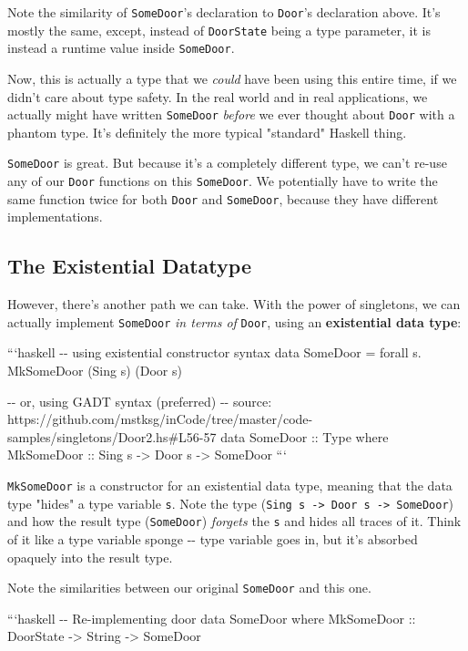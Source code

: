 \documentclass[]{article}
\begin{document}
Note the similarity of \texttt{SomeDoor}'s declaration to \texttt{Door}'s
declaration above. It's mostly the same, except, instead of \texttt{DoorState}
being a type parameter, it is instead a runtime value inside \texttt{SomeDoor}.

Now, this is actually a type that we \emph{could} have been using this entire
time, if we didn't care about type safety. In the real world and in real
applications, we actually might have written \texttt{SomeDoor} \emph{before} we
ever thought about \texttt{Door} with a phantom type. It's definitely the more
typical "standard" Haskell thing.

\texttt{SomeDoor} is great. But because it's a completely different type, we
can't re-use any of our \texttt{Door} functions on this \texttt{SomeDoor}. We
potentially have to write the same function twice for both \texttt{Door} and
\texttt{SomeDoor}, because they have different implementations.

\subsection{The Existential Datatype}

However, there's another path we can take. With the power of singletons, we can
actually implement \texttt{SomeDoor} \emph{in terms of} \texttt{Door}, using an
\textbf{existential data type}:

```haskell -\/- using existential constructor syntax data SomeDoor = forall s.
MkSomeDoor (Sing s) (Door s)

-\/- or, using GADT syntax (preferred) -\/- source:
https://github.com/mstksg/inCode/tree/master/code-samples/singletons/Door2.hs\#L56-57
data SomeDoor :: Type where MkSomeDoor :: Sing s -\textgreater{} Door s
-\textgreater{} SomeDoor ```

\texttt{MkSomeDoor} is a constructor for an existential data type, meaning that
the data type "hides" a type variable \texttt{s}. Note the type
(\texttt{Sing\ s\ -\textgreater{}\ Door\ s\ -\textgreater{}\ SomeDoor}) and how
the result type (\texttt{SomeDoor}) \emph{forgets} the \texttt{s} and hides all
traces of it. Think of it like a type variable sponge -\/- type variable goes
in, but it's absorbed opaquely into the result type.

Note the similarities between our original \texttt{SomeDoor} and this one.

```haskell -\/- \textbar{} Re-implementing door data SomeDoor where MkSomeDoor
:: DoorState -\textgreater{} String -\textgreater{} SomeDoor
\end{document}
